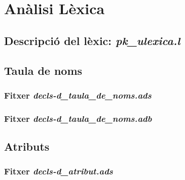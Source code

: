 \section{Anàlisi Lèxica}

\subsection{Descripció del lèxic: \emph{pk\_ulexica.l}}

\newpage

\subsection{Taula de noms}
\subsubsection{Fitxer \emph{decls-d\_taula\_de\_noms.ads}}

\newpage

\subsubsection{Fitxer \emph{decls-d\_taula\_de\_noms.adb}}

\newpage

\subsection{Atributs}
\subsubsection{Fitxer \emph{decls-d\_atribut.ads}}

\newpage

